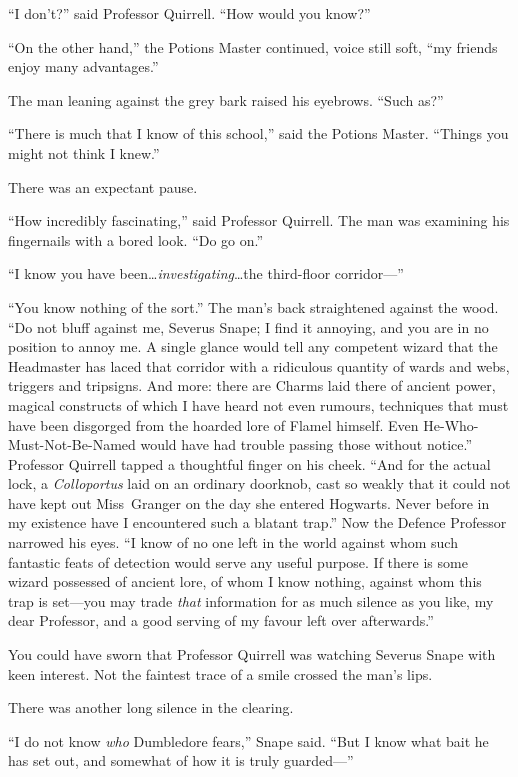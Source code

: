 “I don’t?” said Professor Quirrell. “How would you know?”

“On the other hand,” the Potions Master continued, voice still soft, “my friends enjoy many advantages.”

The man leaning against the grey bark raised his eyebrows. “Such as?”

“There is much that I know of this school,” said the Potions Master. “Things you might not think I knew.”

There was an expectant pause.

“How incredibly fascinating,” said Professor Quirrell. The man was examining his fingernails with a bored look. “Do go on.”

“I know you have been…\emph{investigating}…the third-floor corridor—”

“You know nothing of the sort.” The man’s back straightened against the wood. “Do not bluff against me, Severus Snape; I find it annoying, and you are in no position to annoy me. A single glance would tell any competent wizard that the Headmaster has laced that corridor with a ridiculous quantity of wards and webs, triggers and tripsigns. And more: there are Charms laid there of ancient power, magical constructs of which I have heard not even rumours, techniques that must have been disgorged from the hoarded lore of Flamel himself. Even He-Who-Must-Not-Be-Named would have had trouble passing those without notice.” Professor Quirrell tapped a thoughtful finger on his cheek. “And for the actual lock, a \emph{Colloportus} laid on an ordinary doorknob, cast so weakly that it could not have kept out Miss~Granger on the day she entered Hogwarts. Never before in my existence have I encountered such a blatant trap.” Now the Defence Professor narrowed his eyes. “I know of no one left in the world against whom such fantastic feats of detection would serve any useful purpose. If there is some wizard possessed of ancient lore, of whom I know nothing, against whom this trap is set—you may trade \emph{that} information for as much silence as you like, my dear Professor, and a good serving of my favour left over afterwards.”

You could have sworn that Professor Quirrell was watching Severus Snape with keen interest. Not the faintest trace of a smile crossed the man’s lips.

There was another long silence in the clearing.

“I do not know \emph{who} Dumbledore fears,” Snape said. “But I know what bait he has set out, and somewhat of how it is truly guarded—”

